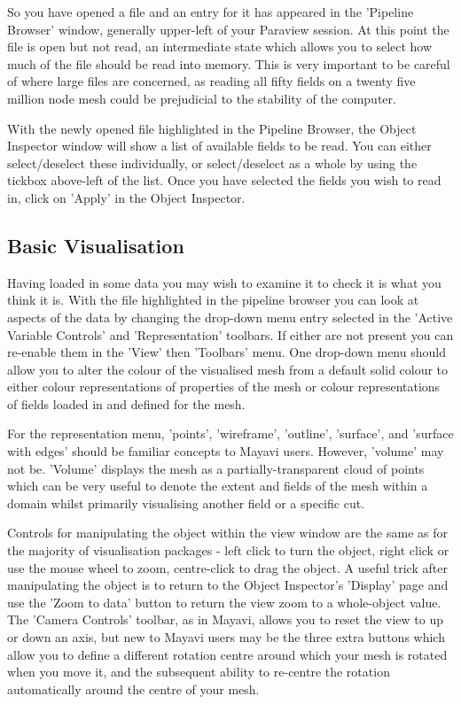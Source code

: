 So you have opened a file and an entry for it has appeared in the 'Pipeline Browser' window, generally upper-left of your Paraview session. At this point the file is open but not read, an intermediate state which allows you to select how much of the file should be read into memory. This is very important to be careful of where large files are concerned, as reading all fifty fields on a twenty five million node mesh could be prejudicial to the stability of the computer.

\begin{figure}[h!]
\label{paraview7}
  \centering
\end{figure}

With the newly opened file highlighted in the Pipeline Browser, the Object Inspector window will show a list of available fields to be read. You can either select/deselect these individually, or select/deselect as a whole by using the tickbox above-left of the list. Once you have selected the fields you wish to read in, click on 'Apply' in the Object Inspector.

\subsection{Basic Visualisation}

Having loaded in some data you may wish to examine it to check it is what you think it is. With the file highlighted in the pipeline browser you can look at aspects of the data by changing the drop-down menu entry selected in the 'Active Variable Controls' and 'Representation' toolbars. If either are not present you can re-enable them in the 'View' then 'Toolbars' menu. One drop-down menu should allow you to alter the colour of the visualised mesh from a default solid colour to either colour representations of properties of the mesh or colour representations of fields loaded in and defined for the mesh.

For the representation menu, 'points', 'wireframe', 'outline', 'surface', and 'surface with edges' should be familiar concepts to Mayavi users. However, 'volume' may not be. 'Volume' displays the mesh as a partially-transparent cloud of points which can be very useful to denote the extent and fields of the mesh within a domain whilst primarily visualising another field or a specific cut.

Controls for manipulating the object within the view window are the same as for the majority of visualisation packages - left click to turn the object, right click or use the mouse wheel to zoom, centre-click to drag the object. A useful trick after manipulating the object is to return to the Object Inspector's 'Display' page and use the 'Zoom to data' button to return the view zoom to a whole-object value. The 'Camera Controls' toolbar, as in Mayavi, allows you to reset the view to up or down an axis, but new to Mayavi users may be the three extra buttons which allow you to define a different rotation centre around which your mesh is rotated when you move it, and the subsequent ability to re-centre the rotation automatically around the centre of your mesh.

